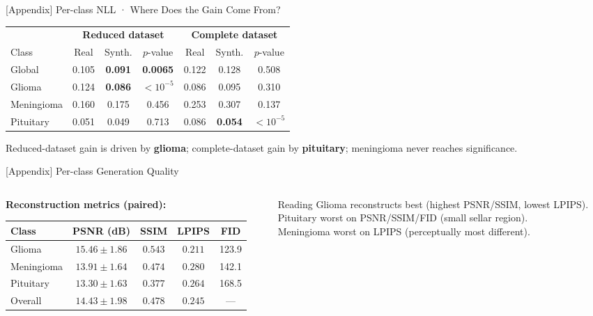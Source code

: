\documentclass[aspectratio=169]{beamer}
\begin{document}
\begin{frame}{[Appendix] Per-class NLL · Where Does the Gain Come From?}
  \begin{center}
  \scriptsize
  \begin{tabular}{lcccccc}
    \toprule
    & \multicolumn{3}{c}{\textbf{Reduced dataset}} & \multicolumn{3}{c}{\textbf{Complete dataset}} \\
    \cmidrule(lr){2-4}\cmidrule(lr){5-7}
    Class & Real & Synth. & $p$-value & Real & Synth. & $p$-value \\
    \midrule
    Global      & 0.105 & \textbf{0.091} & \textbf{0.0065} & 0.122 & 0.128 & 0.508 \\
    Glioma      & 0.124 & \textbf{0.086} & $<10^{-5}$       & 0.086 & 0.095 & 0.310 \\
    Meningioma  & 0.160 & 0.175 & 0.456                    & 0.253 & 0.307 & 0.137 \\
    Pituitary   & 0.051 & 0.049 & 0.713                    & 0.086 & \textbf{0.054} & $<10^{-5}$ \\
    \bottomrule
  \end{tabular}
  \end{center}
  \vspace{0.4em}
  {\footnotesize Reduced-dataset gain is driven by \textbf{glioma}; complete-dataset gain by \textbf{pituitary}; meningioma never reaches significance.}
\end{frame}

\begin{frame}{[Appendix] Per-class Generation Quality}
  \begin{columns}
    \begin{column}{0.55\textwidth}
      \textbf{Reconstruction metrics (paired):}\\
      \scriptsize
      \begin{tabular}{lcccc}
        \toprule
        Class & PSNR (dB) & SSIM & LPIPS & FID \\
        \midrule
        Glioma     & $15.46\pm1.86$ & $0.543$ & $0.211$ & 123.9 \\
        Meningioma & $13.91\pm1.64$ & $0.474$ & $0.280$ & 142.1 \\
        Pituitary  & $13.30\pm1.63$ & $0.377$ & $0.264$ & 168.5 \\
        \midrule
        Overall    & $14.43\pm1.98$ & $0.478$ & $0.245$ & --- \\
        \bottomrule
      \end{tabular}
      \normalsize
    \end{column}
    \begin{column}{0.42\textwidth}
      \begin{block}{Reading}
        Glioma reconstructs best
        (highest PSNR/SSIM, lowest LPIPS).\\[4pt]
        Pituitary worst on PSNR/SSIM/FID
        (small sellar region).\\[4pt]
        Meningioma worst on LPIPS
        (perceptually most different).
      \end{block}
    \end{column}
  \end{columns}
\end{frame}
\end{document}
